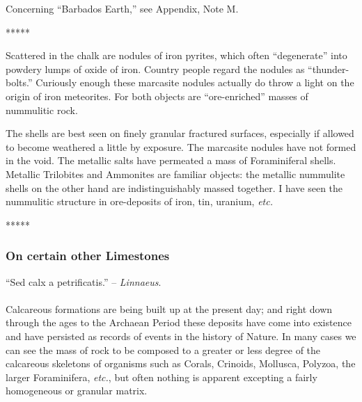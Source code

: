 \documentclass[a4paper, 12pt, oneside]{article}
\begin{document}
Concerning ``Barbados Earth,'' see Appendix, Note M.

\centerline{*\hspace{15mm}*\hspace{15mm}*\hspace{15mm}*\hspace{15mm}*}
\bigskip

Scattered in the chalk are nodules of iron pyrites, which often ``degenerate'' into powdery lumps of oxide of iron. Country people regard the nodules as ``thunder-bolts.'' Curiously enough these marcasite nodules actually do throw a light on the origin of iron meteorites. For both objects are ``ore-enriched'' masses of nummulitic rock.

The shells are best seen on finely granular fractured surfaces, especially if allowed to become weathered a little by exposure. The marcasite nodules have not formed in the void. The metallic salts have permeated a mass of Foraminiferal shells. Metallic Trilobites and Ammonites are familiar objects: the metallic nummulite shells on the other hand are indistinguishably massed together. I have seen the nummulitic structure in ore-deposits of iron, tin, uranium, \emph{etc.}

\centerline{*\hspace{15mm}*\hspace{15mm}*\hspace{15mm}*\hspace{15mm}*}
\bigskip

\subsubsection{On certain other Limestones}
\begin{displayquote}
``Sed calx a petrificatis.'' -- \emph{Linnaeus}.
\end{displayquote}
\paragraph{}
Calcareous formations are being built up at the present day; and right down through the ages to the Archaean Period these deposits have come into existence and have persisted as records of events in the history of Nature. In many cases we can see the mass of rock to be composed to a greater or less degree of the calcareous skeletons of organisms such as Corals, Crinoids, Mollusca, Polyzoa, the larger Foraminifera, \emph{etc.}, but often nothing is apparent excepting a fairly homogeneous or granular matrix.
\end{document}
